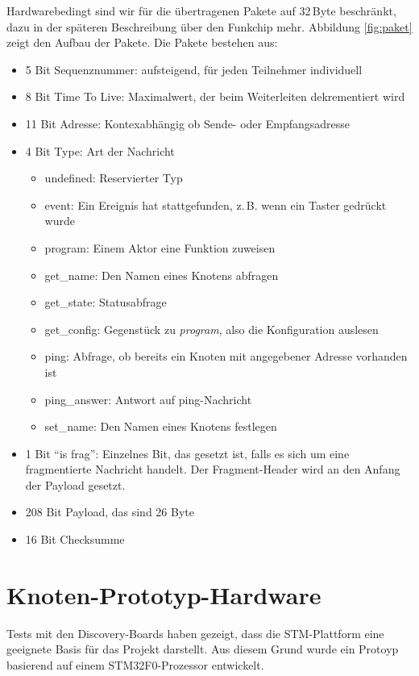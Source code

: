 \documentclass{IEEEtran}
\begin{document}
        Hardwarebedingt sind wir für die übertragenen Pakete auf 32\,Byte 
        beschränkt, dazu in der späteren Beschreibung über den Funkchip mehr. 
        Abbildung \ref{fig:paket} zeigt den Aufbau der Pakete. Die Pakete 
        bestehen aus:
        \begin{itemize}
            \item 5 Bit Sequenznummer: aufsteigend, für jeden Teilnehmer individuell
            \item 8 Bit Time To Live: Maximalwert, der beim Weiterleiten dekrementiert wird
            \item 11 Bit Adresse: Kontexabhängig ob Sende- oder Empfangsadresse
            \item 4 Bit Type: Art der Nachricht
            \begin{itemize}
                \item undefined: Reservierter Typ
                \item event: Ein Ereignis hat stattgefunden, z.\,B. wenn ein Taster gedrückt wurde
                \item program: Einem Aktor eine Funktion zuweisen
                \item get\_name: Den Namen eines Knotens abfragen
                \item get\_state: Statusabfrage
                \item get\_config: Gegenstück zu \emph{program}, also die Konfiguration auslesen
                \item ping: Abfrage, ob bereits ein Knoten mit angegebener Adresse vorhanden ist
                \item ping\_answer: Antwort auf ping-Nachricht
                \item set\_name: Den Namen eines Knotens festlegen
            \end{itemize}
            \item 1 Bit \enquote{is frag}: Einzelnes Bit, das gesetzt ist,
                falls es sich um eine fragmentierte Nachricht handelt.
                Der Fragment-Header wird an den Anfang der Payload gesetzt.
            \item 208 Bit Payload, das sind 26 Byte
            \item 16 Bit Checksumme
        \end{itemize}

\section{Knoten-Prototyp-Hardware}
Tests mit den Discovery-Boards haben gezeigt, dass die STM-Plattform eine
geeignete Basis für das Projekt darstellt.
Aus diesem Grund wurde ein Protoyp basierend auf einem STM32F0-Prozessor entwickelt.
\end{document}
